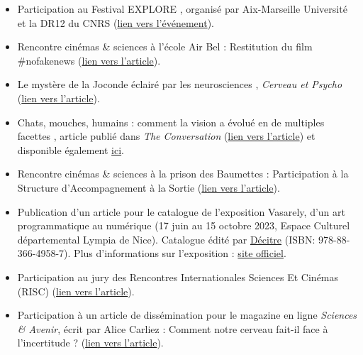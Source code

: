 \documentclass[10pt,french,a4paper,oneside]{article}%
\begin{document}
\begin{itemize}
    \item Participation au \og Festival EXPLORE \fg{}, organisé par Aix-Marseille Université et la DR12 du CNRS (\href{https://laurentperrinet.github.io/talk/2025-06-10_explore-cine-sciences}{lien vers l'événement}).

    \item Rencontre cinémas \& sciences à l'école Air Bel : Restitution du film \og \#nofakenews \fg{} (\href{https://laurentperrinet.github.io/post/2025-09-23_belair-nofakenews/}{lien vers l'article}).

    \item \og Le mystère de la Joconde éclairé par les neurosciences \fg{}, \textit{Cerveau et Psycho} (\href{https://laurentperrinet.github.io/post/2024-08-25-joconde/}{lien vers l'article}).

    \item \og Chats, mouches, humains : comment la vision a évolué en de multiples facettes \fg{}, article publié dans \textit{The Conversation} (\href{https://theconversation.com/le-jeu-du-cerveau-et-du-hasard-159388}{lien vers l'article}) et disponible également \href{https://laurentperrinet.github.io/publication/perrinet-24-yeux/}{ici}.

    \item Rencontre cinémas \& sciences à la prison des Baumettes : Participation à la \og Structure d’Accompagnement à la Sortie \fg{} (\href{https://laurentperrinet.github.io/post/2024-05-23-lieux-fictifs/}{lien vers l'article}).

    \item Publication d’un article pour le catalogue de l’exposition \og Vasarely, d’un art programmatique au numérique \fg{} (17 juin au 15 octobre 2023, Espace Culturel départemental Lympia de Nice). Catalogue édité par \href{https://www.decitre.fr/livres/vasarely-9788836649587.html}{Décitre} (ISBN: 978-88-366-4958-7). Plus d’informations sur l’exposition : \href{https://www.departement06.fr/culture/vasarely-d-un-art-programmatique-au-numerique-13667.html}{site officiel}.

    \item Participation au jury des \og Rencontres Internationales Sciences Et Cinémas (RISC) \fg{} (\href{https://laurentperrinet.github.io/post/2023-12-16-risc/}{lien vers l'article}).

    \item Participation à un article de dissémination pour le magazine en ligne \textit{Sciences \& Avenir}, écrit par Alice Carliez : \og Comment notre cerveau fait-il face à l’incertitude ? \fg{} (\href{https://laurentperrinet.github.io/post/2023-07-26-epsiloon/}{lien vers l'article}).



\end{itemize}
\end{document}
